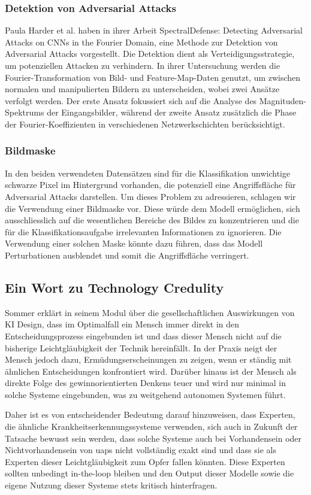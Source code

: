 \subsubsection{Detektion von Adversarial Attacks}
Paula Harder et al. haben in ihrer Arbeit SpectralDefense: Detecting Adversarial Attacks on CNNs in the Fourier Domain, \cite{harder_spectraldefense_2021} eine Methode zur Detektion von Adversarial Attacks vorgestellt. Die Detektion dient als Verteidigungsstrategie, um potenziellen Attacken zu verhindern. In ihrer Untersuchung werden die Fourier-Transformation von Bild- und Feature-Map-Daten genutzt, um zwischen normalen und manipulierten Bildern zu unterscheiden, wobei zwei Ansätze verfolgt werden. Der erste Ansatz fokussiert sich auf die Analyse des Magnituden-Spektrums der Eingangsbilder, während der zweite Ansatz zusätzlich die Phase der Fourier-Koeffizienten in verschiedenen Netzwerkschichten berücksichtigt.

\subsubsection{Bildmaske}
In den beiden verwendeten Datensätzen sind für die Klassifikation unwichtige schwarze Pixel im Hintergrund vorhanden, die potenziell eine Angriffsfläche für Adversarial Attacks darstellen. Um dieses Problem zu adressieren, schlagen wir die Verwendung einer Bildmaske vor. Diese würde dem Modell ermöglichen, sich ausschliesslich auf die wesentlichen Bereiche des Bildes zu konzentrieren und die für die Klassifikationsaufgabe irrelevanten Informationen zu ignorieren. Die Verwendung einer solchen Maske könnte dazu führen, dass das Modell Perturbationen ausblendet und somit die Angriffsfläche verringert.

\newpage

\subsection{Ein Wort zu Technology Credulity}
Sommer \cite{sommer_gesellschaftliche_2024} erklärt in seinem Modul über die gesellschaftlichen Auswirkungen von KI Design, dass im Optimalfall ein Mensch immer direkt in den Entscheidungsprozess eingebunden ist und dass dieser Mensch nicht auf die bisherige Leichtgläubigkeit der Technik hereinfällt. In der Praxis neigt der Mensch jedoch dazu, Ermüdungserscheinungen zu zeigen, wenn er ständig mit ähnlichen Entscheidungen konfrontiert wird. Darüber hinaus ist der Mensch als direkte Folge des gewinnorientierten Denkens teuer und wird nur minimal in solche Systeme eingebunden, was zu weitgehend autonomen Systemen führt.

Daher ist es von entscheidender Bedeutung darauf hinzuweisen, dass Experten, die ähnliche Krankheitserkennungssysteme verwenden, sich auch in Zukunft der Tatsache bewusst sein werden, dass solche Systeme auch bei Vorhandensein oder Nichtvorhandensein von \acrlong{uap}s nicht vollständig exakt sind und dass sie als Experten dieser Leichtgläubigkeit zum Opfer fallen könnten. Diese Experten sollten unbedingt \gls{in-the-loop} bleiben und den Output dieser Modelle sowie die eigene Nutzung dieser Systeme stets kritisch hinterfragen.